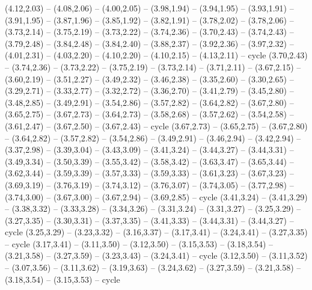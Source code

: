\expandafter\def\csname geo:gebiet:BOL\endcsname{
  (4.12,2.03) -- (4.08,2.06) -- (4.00,2.05) -- (3.98,1.94) -- (3.94,1.95) -- (3.93,1.91) -- (3.91,1.95) -- (3.87,1.96) -- (3.85,1.92) -- (3.82,1.91) -- (3.78,2.02) -- (3.78,2.06) -- (3.73,2.14) -- (3.75,2.19) -- (3.73,2.22) -- (3.74,2.36) -- (3.70,2.43) -- (3.74,2.43) -- (3.79,2.48) -- (3.84,2.48) -- (3.84,2.40) -- (3.88,2.37) -- (3.92,2.36) -- (3.97,2.32) -- (4.01,2.31) -- (4.03,2.20) -- (4.10,2.20) -- (4.10,2.15) -- (4.13,2.11) -- cycle}
\expandafter\def\csname geo:gebiet:PER\endcsname{
  (3.70,2.43) -- (3.74,2.36) -- (3.73,2.22) -- (3.75,2.19) -- (3.73,2.14) -- (3.71,2.11) -- (3.67,2.15) -- (3.60,2.19) -- (3.51,2.27) -- (3.49,2.32) -- (3.46,2.38) -- (3.35,2.60) -- (3.30,2.65) -- (3.29,2.71) -- (3.33,2.77) -- (3.32,2.72) -- (3.36,2.70) -- (3.41,2.79) -- (3.45,2.80) -- (3.48,2.85) -- (3.49,2.91) -- (3.54,2.86) -- (3.57,2.82) -- (3.64,2.82) -- (3.67,2.80) -- (3.65,2.75) -- (3.67,2.73) -- (3.64,2.73) -- (3.58,2.68) -- (3.57,2.62) -- (3.54,2.58) -- (3.61,2.47) -- (3.67,2.50) -- (3.67,2.43) -- cycle}
\expandafter\def\csname geo:gebiet:COL\endcsname{
  (3.67,2.73) -- (3.65,2.75) -- (3.67,2.80) -- (3.64,2.82) -- (3.57,2.82) -- (3.54,2.86) -- (3.49,2.91) -- (3.46,2.94) -- (3.42,2.94) -- (3.37,2.98) -- (3.39,3.04) -- (3.43,3.09) -- (3.41,3.24) -- (3.44,3.27) -- (3.44,3.31) -- (3.49,3.34) -- (3.50,3.39) -- (3.55,3.42) -- (3.58,3.42) -- (3.63,3.47) -- (3.65,3.44) -- (3.62,3.44) -- (3.59,3.39) -- (3.57,3.33) -- (3.59,3.33) -- (3.61,3.23) -- (3.67,3.23) -- (3.69,3.19) -- (3.76,3.19) -- (3.74,3.12) -- (3.76,3.07) -- (3.74,3.05) -- (3.77,2.98) -- (3.74,3.00) -- (3.67,3.00) -- (3.67,2.94) -- (3.69,2.85) -- cycle}
\expandafter\def\csname geo:gebiet:PAN\endcsname{
  (3.41,3.24) -- (3.41,3.29) -- (3.38,3.32) -- (3.33,3.28) -- (3.34,3.26) -- (3.31,3.24) -- (3.31,3.27) -- (3.25,3.29) -- (3.27,3.35) -- (3.30,3.31) -- (3.37,3.35) -- (3.41,3.33) -- (3.44,3.31) -- (3.44,3.27) -- cycle}
\expandafter\def\csname geo:gebiet:CRI\endcsname{
  (3.25,3.29) -- (3.23,3.32) -- (3.16,3.37) -- (3.17,3.41) -- (3.24,3.41) -- (3.27,3.35) -- cycle}
\expandafter\def\csname geo:gebiet:NIC\endcsname{
  (3.17,3.41) -- (3.11,3.50) -- (3.12,3.50) -- (3.15,3.53) -- (3.18,3.54) -- (3.21,3.58) -- (3.27,3.59) -- (3.23,3.43) -- (3.24,3.41) -- cycle}
\expandafter\def\csname geo:gebiet:HND\endcsname{
  (3.12,3.50) -- (3.11,3.52) -- (3.07,3.56) -- (3.11,3.62) -- (3.19,3.63) -- (3.24,3.62) -- (3.27,3.59) -- (3.21,3.58) -- (3.18,3.54) -- (3.15,3.53) -- cycle}
